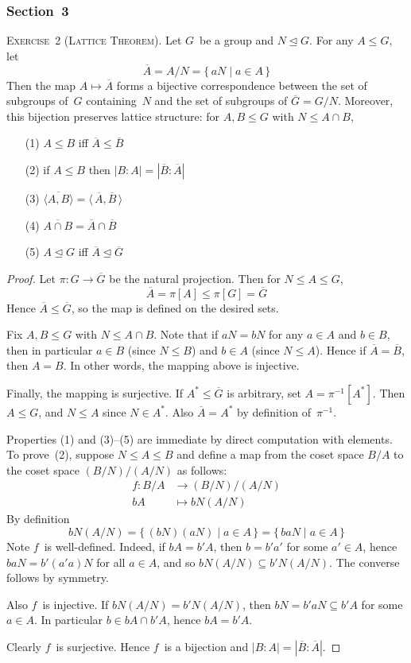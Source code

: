 \documentclass[letterpaper]{article}
\newcommand{\exercise}[1]{\goodbreak\noindent\textsc{Exercise~{#1}.}}
\newcommand{\sect}{\cap}
\newcommand{\subgroup}{\le}
\newcommand{\normal}{\trianglelefteq}
\newcommand{\res}[1]{\overline{#1}}
\newcommand{\gen}[1]{\langle{#1}\rangle}
\newcommand{\gindex}[2]{|{#1}:{#2}|}
\begin{document}
\subsubsection*{Section~3}
\exercise{2 (Lattice Theorem)}
Let $G$~be a group and $N\normal G$. For any $A\subgroup G$, let
$$\res{A}=A/N=\{\,aN\mid a\in A\,\}$$
Then the map $A\mapsto\res{A}$ forms a bijective correspondence between the set of subgroups of~$G$ containing~$N$ and the set of subgroups of $\res{G}=G/N$. Moreover, this bijection preserves lattice structure: for $A,B\subgroup G$ with $N\subgroup A\sect B$,
\begin{enumerate}[itemsep=0pt]
\item[(1)] $A\subgroup B$ iff $\res{A}\subgroup\res{B}$
\item[(2)] if $A\subgroup B$ then $\gindex{B}{A}=\gindex{\res{B}}{\res{A}}$
\item[(3)] $\res{\gen{A,B}}=\gen{\,\res{A},\res{B}\,}$
\item[(4)] $\res{A\sect B}=\res{A}\sect\res{B}$
\item[(5)] $A\normal G$ iff $\res{A}\normal\res{G}$
\end{enumerate}
\begin{proof}
Let $\pi:G\to\res{G}$ be the natural projection. Then for $N\subgroup A\subgroup G$,
$$\res{A}=\pi[A]\subgroup\pi[G]=\res{G}$$
Hence $\res{A}\subgroup\res{G}$, so the map is defined on the desired sets.

Fix $A,B\subgroup G$ with $N\subgroup A\sect B$. Note that if $aN=bN$ for any $a\in A$ and $b\in B$, then in particular $a\in B$ (since $N\subgroup B$) and $b\in A$ (since $N\subgroup A$). Hence if $\res{A}=\res{B}$, then $A=B$. In other words, the mapping above is injective.

Finally, the mapping is surjective. If $A^*\subgroup\res{G}$ is arbitrary, set $A=\pi^{-1}[A^*]$. Then $A\subgroup G$, and $N\subgroup A$ since $N\in A^*$. Also $\res{A}=A^*$ by definition of~$\pi^{-1}$.

Properties (1) and (3)--(5) are immediate by direct computation with elements. To prove~(2), suppose $N\subgroup A\subgroup B$ and define a map from the coset space $B/A$ to the coset space $(B/N)/(A/N)$ as follows:
\begin{align*}
f:B/A&\to(B/N)/(A/N)\\
	bA&\mapsto bN(A/N)
\end{align*}
By definition
$$bN(A/N)=\{\,(bN)(aN)\mid a\in A\,\}=\{\,baN\mid a\in A\,\}$$
Note $f$~is well-defined. Indeed, if $bA=b'A$, then $b=b'a'$ for some $a'\in A$, hence $baN=b'(a'a)N$ for all $a\in A$, and so $bN(A/N)\subseteq b'N(A/N)$. The converse follows by symmetry.

Also $f$~is injective. If $bN(A/N)=b'N(A/N)$, then $bN=b'aN\subseteq b'A$ for some $a\in A$. In particular $b\in bA\sect b'A$, hence $bA=b'A$.

Clearly $f$~is surjective. Hence $f$~is a bijection and $\gindex{B}{A}=\gindex{\res{B}}{\res{A}}$.
\end{proof}
\end{document}
